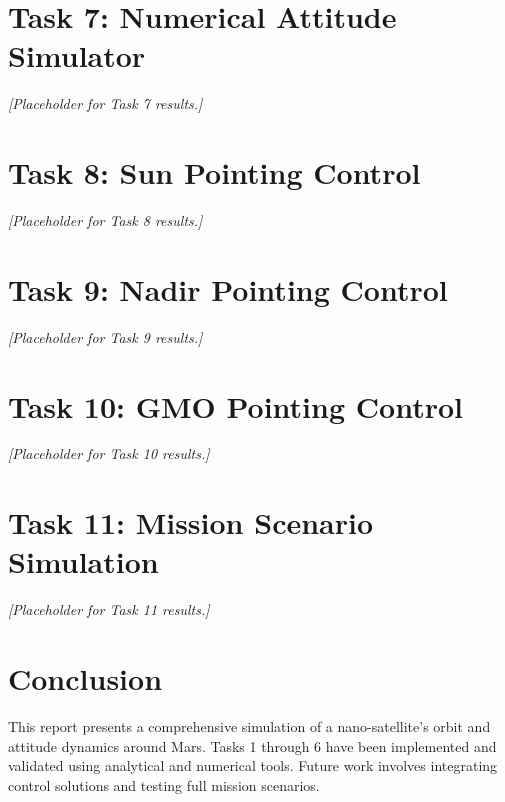 \documentclass[conf]{new-aiaa}
\begin{document}
\section{Task 7: Numerical Attitude Simulator}
\vspace{1em}
\textit{[Placeholder for Task 7 results.]}

\section{Task 8: Sun Pointing Control}
\vspace{1em}
\textit{[Placeholder for Task 8 results.]}

\section{Task 9: Nadir Pointing Control}
\vspace{1em}
\textit{[Placeholder for Task 9 results.]}

\section{Task 10: GMO Pointing Control}
\vspace{1em}
\textit{[Placeholder for Task 10 results.]}

\section{Task 11: Mission Scenario Simulation}
\vspace{1em}
\textit{[Placeholder for Task 11 results.]}

\section{Conclusion}
This report presents a comprehensive simulation of a nano-satellite’s orbit and attitude dynamics around Mars. Tasks 1 through 6 have been implemented and validated using analytical and numerical tools. Future work involves integrating control solutions and testing full mission scenarios.
\end{document}
